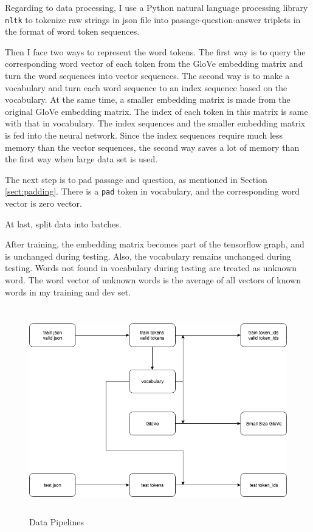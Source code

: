 \documentclass[modernstyle,12pt]{sjsuthesis}
\theoremstyle{definition}
\begin{document}
Regarding to data processing, I use a Python natural language processing library {\tt nltk} to tokenize raw strings in json file into passage-question-answer triplets in the format of word token sequences.

Then I face two ways to represent the word tokens. The first way is to query the corresponding word vector of each token from the GloVe embedding matrix and turn the word sequences into vector sequences.  The second way is to make a vocabulary and turn each word sequence to an index sequence based on the vocabulary. At the same time, a smaller embedding matrix is made from the original GloVe embedding matrix. The index of each token in this matrix is same with that in vocabulary. The index sequences and the smaller embedding matrix is fed into the neural network. Since the index sequences require much less memory than the vector sequences, the second way saves a lot of memory than the first way when large data set is used.


The next step is to pad passage and question, as mentioned in Section \ref{sect:padding}. There is a {\tt pad} token in vocabulary, and the corresponding word vector is zero vector.

At last, split data into batches.

After training, the embedding matrix becomes part of the tensorflow graph, and is unchanged during testing. Also, the vocabulary remains unchanged during testing. Words not found in vocabulary during testing are treated as unknown word. The word vector of unknown words is the average of all vectors of known words in my training and dev set.

\begin{figure}[htbp]\centering
  \includegraphics[width=12cm, height=9cm]{figures/data.png}
  \caption{Data Pipelines}
  \label{f:data}
\end{figure}
\end{document}
